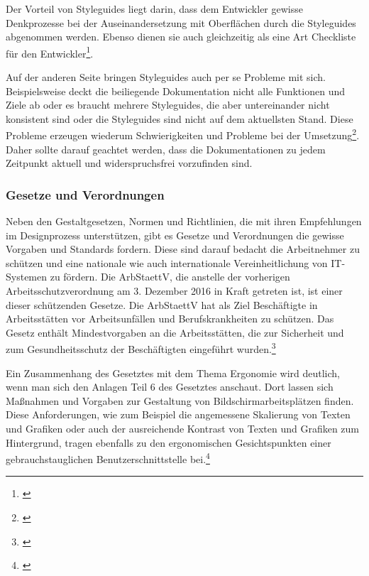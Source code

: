 Der Vorteil von Styleguides liegt darin, dass dem Entwickler gewisse Denkprozesse bei der Auseinandersetzung mit Oberflächen durch die Styleguides abgenommen werden. Ebenso dienen sie auch gleichzeitig als eine Art Checkliste für den Entwickler\footnote{\cite[vgl.][214]{Thomaschewski2013}}.

Auf der anderen Seite bringen Styleguides auch per se Probleme mit sich. Beispielsweise deckt die beiliegende Dokumentation nicht alle Funktionen und Ziele ab oder es braucht mehrere Styleguides, die aber untereinander nicht konsistent sind oder die Styleguides sind nicht auf dem aktuellsten Stand. Diese Probleme erzeugen wiederum Schwierigkeiten und Probleme bei der Umsetzung\footnote{\cite[vgl.][215]{Thomaschewski2013}}. Daher sollte darauf geachtet werden, dass die Dokumentationen zu jedem Zeitpunkt aktuell und widerspruchsfrei vorzufinden sind.


\subsubsection{Gesetze und Verordnungen}
\label{sec:gesetzeUndVerordnungen}
Neben den Gestaltgesetzen, Normen und Richtlinien, die mit ihren Empfehlungen im Designprozess unterstützen, gibt es Gesetze und Verordnungen die gewisse Vorgaben und Standards fordern. Diese sind darauf bedacht die Arbeitnehmer zu schützen und eine nationale wie auch internationale Vereinheitlichung von IT-Systemen zu fördern. Die \gls{ArbStaettV}, die anstelle der vorherigen Arbeitsschutzverordnung am 3. Dezember 2016 in Kraft getreten ist, ist einer dieser schützenden Gesetze. Die \gls{ArbStaettV} hat als Ziel Beschäftigte in Arbeitsstätten vor Arbeitsunfällen und Berufskrankheiten zu schützen. Das Gesetz enthält Mindestvorgaben an die Arbeitsstätten, die zur Sicherheit und zum Gesundheitsschutz der Beschäftigten eingeführt wurden.\footnote{\cite[vgl.][]{BAuA}}

Ein Zusammenhang des Gesetztes mit dem Thema Ergonomie wird deutlich, wenn man sich den Anlagen Teil 6 des Gesetztes anschaut. Dort lassen sich Maßnahmen und Vorgaben zur Gestaltung von Bildschirmarbeitsplätzen finden. Diese Anforderungen, wie zum Beispiel die angemessene Skalierung von Texten und Grafiken oder auch der ausreichende Kontrast von Texten und Grafiken zum Hintergrund, tragen ebenfalls zu den ergonomischen Gesichtspunkten einer gebrauchstauglichen Benutzerschnittstelle bei.\footnote{\cite[vgl.][Anhang: Kap. 6]{ArbStaettV}}

